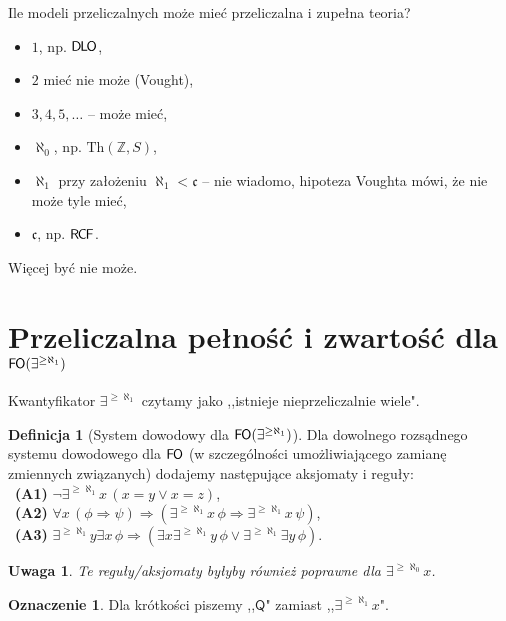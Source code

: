 \documentclass{article}
\newcommand{\Z}{\mathbb{Z}}
\theoremstyle{plain}
\newtheorem{uw}[thm]{Uwaga}
\theoremstyle{definition}
\newtheorem{df}[thm]{Definicja}
\newtheorem{ozn}[thm]{Oznaczenie}
\theoremstyle{remark}
\newcommand{\DLO}{\mathsf{D \mkern-1.5mu L \mkern-1.8mu O}}
\newcommand{\RCF}{\mathsf{R \mkern-1.7mu C \mkern-1.4mu F}}
\newcommand{\FO}{\mathsf{F \mkern-1.4mu O}}
\newcommand{\q}{\mathsf{Q}}
\newcommand{\Th}{\text{Th}}
\begin{document}
Ile modeli przeliczalnych może mieć przeliczalna i zupełna teoria?
\begin{itemize}
	\item $1$, np. $\DLO$,
	\item $2$ mieć nie może (Vought),
	\item $3, 4, 5, \ldots$ -- może mieć,
	\item $\aleph_0$, np. $\Th(\Z, S)$,
	\item $\aleph_1$ przy założeniu $\aleph_1 < \mathfrak{c}$ -- nie
		wiadomo, hipoteza Voughta mówi, że nie może tyle mieć,
	\item $ \mathfrak{c}$, np. $\RCF$.
\end{itemize}
Więcej być nie może.



\section{Przeliczalna pełność i zwartość dla $\FO(\exists^{\geq \aleph_1})$}

Kwantyfikator $\exists^{\geq \aleph_1}$ czytamy jako ,,istnieje
nieprzeliczalnie wiele".

\begin{df}[System dowodowy dla $\FO(\exists^{\geq \aleph_1})$]
	 Dla dowolnego rozsądnego systemu dowodowego dla $\FO$ (w szczególności
	 umożliwiającego zamianę zmiennych związanych)
	 dodajemy następujące aksjomaty i reguły:
	 \\\mbox{ }\textbf{(A1)}
	 $\neg \exists^{\geq \aleph_1} x \, (x = y \vee x = z)$,
	 \\\mbox{ }\textbf{(A2)} $\forall x \,(\phi \Rightarrow \psi)
	 \Rightarrow (\exists^{\geq \aleph_1} x \, \phi \Rightarrow
	 \exists^{\geq \aleph_1} x \, \psi)$,
	 \\\mbox{ }\textbf{(A3)} $\exists^{\geq \aleph_1} y \exists x \, \phi
	 \Rightarrow (\exists x \exists^{\geq \aleph_1} y \, \phi \vee
	 \exists^{\geq \aleph_1} \exists y \, \phi)$.
\end{df}

\begin{uw}
	Te reguły/aksjomaty byłyby również poprawne dla
	$\exists^{\geq \aleph_0} x$.
\end{uw}

\begin{ozn}
	Dla krótkości piszemy ,,$\q$" zamiast ,,$\exists^{\geq \aleph_1} x$".
\end{ozn}
\end{document}
